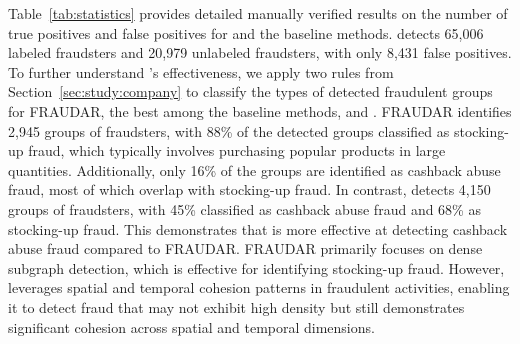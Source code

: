 Table~\ref{tab:statistics} provides detailed manually verified results on the number of true positives and false positives for \toolname and the baseline methods. \toolname detects 65,006 labeled fraudsters and 20,979 unlabeled fraudsters, with only 8,431 false positives. 
To further understand \toolname's effectiveness, we apply two rules from Section~\ref{sec:study:company} to classify the types of detected fraudulent groups for FRAUDAR, the best among the baseline methods, and \toolname. FRAUDAR identifies 2,945 groups of fraudsters, with 88\% of the detected groups classified as stocking-up fraud, which typically involves purchasing popular products in large quantities. Additionally, only 16\% of the groups are identified as cashback abuse fraud, most of which overlap with stocking-up fraud. 
In contrast, \toolname detects 4,150 groups of fraudsters, with 45\% classified as cashback abuse fraud and 68\% as stocking-up fraud. This demonstrates that \toolname is more effective at detecting cashback abuse fraud compared to FRAUDAR. FRAUDAR primarily focuses on dense subgraph detection, which is effective for identifying stocking-up fraud. However, \toolname leverages spatial and temporal cohesion patterns in fraudulent activities, enabling it to detect fraud that may not exhibit high density but still demonstrates significant cohesion across spatial and temporal dimensions.


